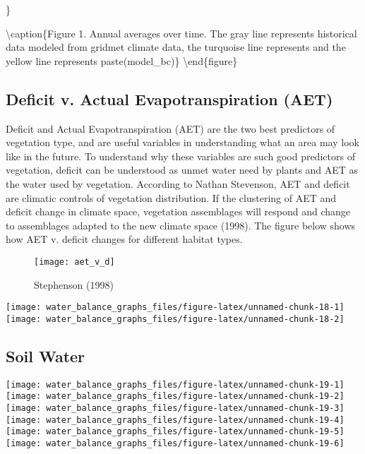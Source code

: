 \documentclass[
]{article}
\begin{document}
\}

\textbackslash caption\{Figure 1. Annual averages over time. The gray
line represents historical data modeled from gridmet climate data, the
turquoise line represents and the yellow line represents
paste(model\_bc)\}\label{fig:unnamed-chunk-16}
\textbackslash end\{figure\}

\hypertarget{deficit-v.-actual-evapotranspiration-aet}{%
\subsection{Deficit v. Actual Evapotranspiration
(AET)}\label{deficit-v.-actual-evapotranspiration-aet}}

Deficit and Actual Evapotranspiration (AET) are the two best predictors
of vegetation type, and are useful variables in understanding what an
area may look like in the future. To understand why these variables are
such good predictors of vegetation, deficit can be understood as unmet
water need by plants and AET as the water used by vegetation. According
to Nathan Stevenson, AET and deficit are climatic controls of vegetation
distribution. If the clustering of AET and deficit change in climate
space, vegetation assemblages will respond and change to assemblages
adapted to the new climate space (1998). The figure below shows how AET
v. deficit changes for different habitat types.

\begin{figure}

{\centering \texttt{[image: aet\_v\_d]} 

}

\caption{Stephenson (1998)}\label{fig:unnamed-chunk-17}
\end{figure}

\texttt{[image: water\_balance\_graphs\_files/figure-latex/unnamed-chunk-18-1]}
\texttt{[image: water\_balance\_graphs\_files/figure-latex/unnamed-chunk-18-2]}

\hypertarget{soil-water}{%
\subsection{Soil Water}\label{soil-water}}

\texttt{[image: water\_balance\_graphs\_files/figure-latex/unnamed-chunk-19-1]}
\texttt{[image: water\_balance\_graphs\_files/figure-latex/unnamed-chunk-19-2]}
\texttt{[image: water\_balance\_graphs\_files/figure-latex/unnamed-chunk-19-3]}
\texttt{[image: water\_balance\_graphs\_files/figure-latex/unnamed-chunk-19-4]}
\texttt{[image: water\_balance\_graphs\_files/figure-latex/unnamed-chunk-19-5]}
\texttt{[image: water\_balance\_graphs\_files/figure-latex/unnamed-chunk-19-6]}
\end{document}
